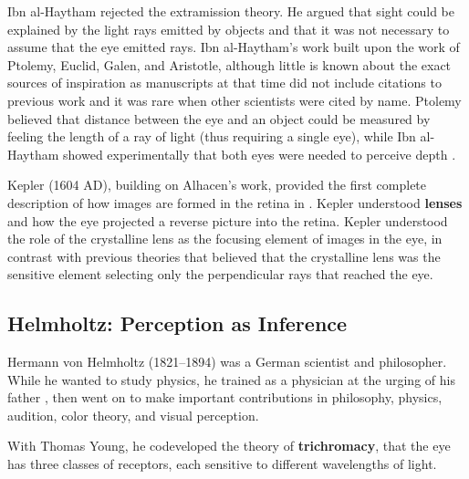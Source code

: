 Ibn al-Haytham rejected the extramission theory. He argued that sight could be explained by the light rays emitted by objects and that it was not necessary to assume that the eye emitted rays. Ibn al-Haytham's work built upon the work of Ptolemy, Euclid, Galen, and Aristotle, although little is known about the exact sources of inspiration as manuscripts at that time did not include citations to previous work and it was rare when other scientists were cited by name. Ptolemy believed that distance between the eye and an object could be measured by feeling the length of a ray of light (thus requiring a single eye), while Ibn al-Haytham showed experimentally that both eyes were needed to perceive depth \cite{2001alhacen}.



Kepler (1604 AD), building on Alhacen's work, provided the first complete description of how images are formed in the retina in 
\cite{Martens2001-MAROPT-2}. Kepler understood {\bf lenses} and how the eye projected a reverse picture into the retina. Kepler understood the role of the crystalline lens as the focusing element of images in the eye, in contrast with previous theories that believed that the crystalline lens was the sensitive element selecting only the perpendicular rays that reached the eye.



\subsection{Helmholtz: Perception as Inference}


Hermann von Helmholtz (1821--1894) was a German scientist and philosopher. While he wanted to study physics, he trained as a physician at the urging of his father \cite{Shapin2019}, then went on to make important contributions in philosophy, physics, audition, color theory, and visual perception.


With Thomas Young, he codeveloped the theory of {\bf trichromacy},
that the eye has three classes of receptors, each sensitive to different wavelengths of light.  

